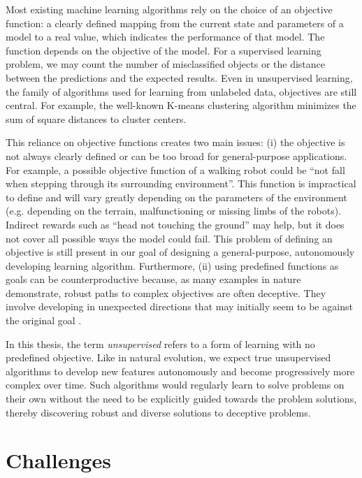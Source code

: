 Most existing machine learning algorithms rely on the choice of an objective
function: a clearly defined mapping from the current state and parameters of a
model to a real value, which indicates the performance of that model. The
function depends on the objective of the model. For a supervised learning
problem, we may count the number of misclassified objects or the distance
between the predictions and the expected results. Even in unsupervised learning,
the family of algorithms used for learning from unlabeled data, objectives are
still central. For example, the well-known K-means clustering algorithm minimizes
the sum of square distances to cluster centers.

This reliance on objective functions creates two main issues: (i) the objective
is not always clearly defined or can be too broad for general-purpose
applications. For example, a possible objective function of a walking robot
could be ``not fall when stepping through its surrounding environment''. This
function is impractical to define and will vary greatly depending on the
parameters of the environment (e.g. depending on the terrain, malfunctioning or 
missing limbs of the robots). Indirect rewards such as ``head not touching the ground''
may help, but it does not cover all possible ways the model could fail. 
This problem of defining an objective is still present in our goal of designing
a general-purpose, autonomously developing learning algorithm.
Furthermore, (ii) using predefined functions as goals can be counterproductive
because, as many examples in nature demonstrate, robust paths to complex
objectives are often deceptive. They involve developing in unexpected directions
that may initially seem to be against the original goal
\parencite{stanleyWhyGreatnessCannot2015}.

In this thesis, the term \emph{unsupervised} refers to a form of learning with
no predefined objective. Like in natural evolution, we expect true unsupervised
algorithms to develop new features autonomously and become progressively more
complex over time. Such algorithms would regularly learn to solve problems on
their own without the need to be explicitly guided towards the problem solutions, 
thereby discovering robust
and diverse solutions to deceptive problems.


\section{Challenges}\label{sec:challenges}

